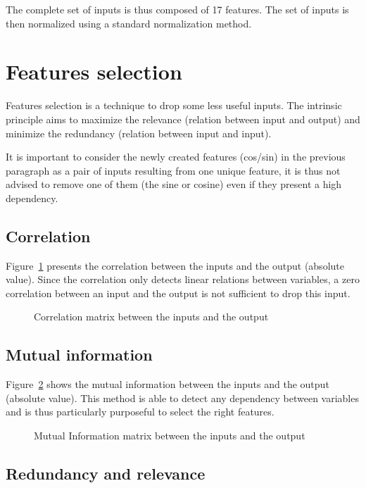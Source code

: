 \documentclass[journal,11pt]{IEEEtran}
\begin{document}
The complete set of inputs is thus composed of 17 features.
The set of inputs is then normalized using a standard normalization method. 

\section{Features selection}
\label{Features_selection}

Features selection is a technique to drop some less useful inputs. The intrinsic principle aims to maximize the relevance (relation between input and output) and minimize the redundancy (relation between input and input).

It is important to consider the newly created features (cos/sin) in the previous paragraph as a pair of inputs resulting from one unique feature, it is thus not advised to remove one of them  (the sine or cosine) even if they present a high dependency.

\subsection{Correlation}

Figure~\ref{fig:corr} presents the correlation between the inputs and the output (absolute value). Since the correlation only detects linear relations between variables, a zero correlation between an input and the output is not sufficient to drop this input.

\begin{figure}[H]
    \centering
    
    \caption{Correlation matrix between the inputs and the output}
    \label{fig:corr}
\end{figure}

\subsection{Mutual information}

Figure~\ref{fig:MI} shows the mutual information between the inputs and the output (absolute value). This method is able to detect any dependency between variables and is thus particularly purposeful to select the right features.

\begin{figure}[H]
    \centering
    
    \caption{Mutual Information matrix between the inputs and the output}
    \label{fig:MI}
\end{figure}

\subsection{Redundancy and relevance}
\end{document}
